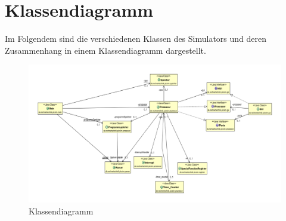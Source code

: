 \newpage
\section{Klassendiagramm}
Im Folgendem sind die verschiedenen Klassen des Simulators und deren Zusammenhang in einem Klassendiagramm dargestellt.

\begin{figure}[h]
\centering
\includegraphics[scale=0.52, angle=90]{Bilder/Architektur.pdf}
\caption{Klassendiagramm}
\end{figure}